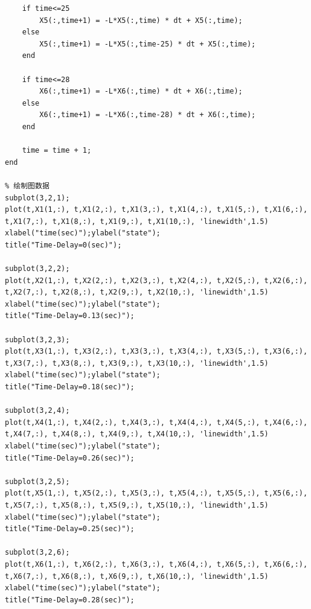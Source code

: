 \documentclass{article}
\begin{document}
\begin{lstlisting}
    if time<=25
        X5(:,time+1) = -L*X5(:,time) * dt + X5(:,time);
    else
        X5(:,time+1) = -L*X5(:,time-25) * dt + X5(:,time);
    end

    if time<=28
        X6(:,time+1) = -L*X6(:,time) * dt + X6(:,time);
    else
        X6(:,time+1) = -L*X6(:,time-28) * dt + X6(:,time);
    end
    
    time = time + 1;
end

% 绘制图数据
subplot(3,2,1);
plot(t,X1(1,:), t,X1(2,:), t,X1(3,:), t,X1(4,:), t,X1(5,:), t,X1(6,:), t,X1(7,:), t,X1(8,:), t,X1(9,:), t,X1(10,:), 'linewidth',1.5)
xlabel("time(sec)");ylabel("state");
title("Time-Delay=0(sec)");

subplot(3,2,2);
plot(t,X2(1,:), t,X2(2,:), t,X2(3,:), t,X2(4,:), t,X2(5,:), t,X2(6,:), t,X2(7,:), t,X2(8,:), t,X2(9,:), t,X2(10,:), 'linewidth',1.5)
xlabel("time(sec)");ylabel("state");
title("Time-Delay=0.13(sec)");

subplot(3,2,3);
plot(t,X3(1,:), t,X3(2,:), t,X3(3,:), t,X3(4,:), t,X3(5,:), t,X3(6,:), t,X3(7,:), t,X3(8,:), t,X3(9,:), t,X3(10,:), 'linewidth',1.5)
xlabel("time(sec)");ylabel("state");
title("Time-Delay=0.18(sec)");

subplot(3,2,4);
plot(t,X4(1,:), t,X4(2,:), t,X4(3,:), t,X4(4,:), t,X4(5,:), t,X4(6,:), t,X4(7,:), t,X4(8,:), t,X4(9,:), t,X4(10,:), 'linewidth',1.5)
xlabel("time(sec)");ylabel("state");
title("Time-Delay=0.26(sec)");

subplot(3,2,5);
plot(t,X5(1,:), t,X5(2,:), t,X5(3,:), t,X5(4,:), t,X5(5,:), t,X5(6,:), t,X5(7,:), t,X5(8,:), t,X5(9,:), t,X5(10,:), 'linewidth',1.5)
xlabel("time(sec)");ylabel("state");
title("Time-Delay=0.25(sec)");

subplot(3,2,6);
plot(t,X6(1,:), t,X6(2,:), t,X6(3,:), t,X6(4,:), t,X6(5,:), t,X6(6,:), t,X6(7,:), t,X6(8,:), t,X6(9,:), t,X6(10,:), 'linewidth',1.5)
xlabel("time(sec)");ylabel("state");
title("Time-Delay=0.28(sec)");
\end{lstlisting}
\end{document}
